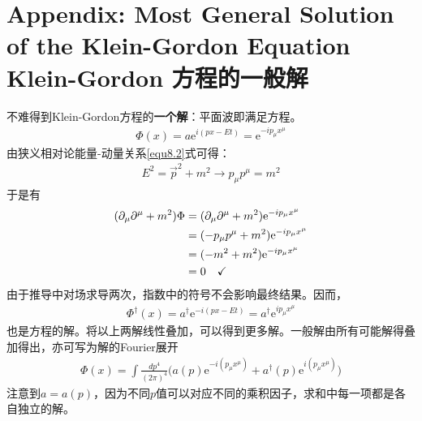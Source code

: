 \section[Klein-Gordon 方程的一般解]{Appendix: Most General Solution of the Klein-Gordon Equation \quad Klein-Gordon 方程的一般解}\label{sec9.6}
不难得到Klein-Gordon方程的\textbf{一个解}：平面波即满足方程。
\begin{gather*}
\Phi(x)=a\text{e}^{i(px-Et)}=\text{e}^{-ip_\mu x^\mu}
\end{gather*}
由狭义相对论能量-动量关系\eqref{equ8.2}式可得：
\begin{gather*}
E^2=\vec{p}^2+m^2\to p_\mu p^\mu=m^2
\end{gather*}
于是有
\begin{align}
(\partial_\mu\partial^\mu+m^2)\Phi&=(\partial_\mu\partial^\mu+m^2)\text{e}^{-ip_\mu x^\mu} \notag \\
&=(-p_\mu p^\mu+m^2)\text{e}^{-ip_\mu x^\mu} \notag \\
&=(-m^2+m^2)\text{e}^{-ip_\mu x^\mu} \notag \\
&=0\quad\checkmark \label{equ9.77}
\end{align}
由于推导中对场求导两次，指数中的符号不会影响最终结果。因而，
\begin{gather*}
\Phi^\dag(x)=a^\dag \text{e}^{-i(px-Et)}=a^\dag \text{e}^{ip_\mu x^\mu}
\end{gather*}
也是方程的解。将以上两解线性叠加，可以得到更多解。一般解由所有可能解得叠加得出，亦可写为解的Fourier展开
\begin{gather*}
\Phi(x)=\int \frac{dp^4}{(2\pi)^4}\Big( a(p)\text{e}^{-i(p_\mu x^\mu)}+a^\dag(p)\text{e}^{i(p_\mu x^\mu)} \Big)
\end{gather*}
注意到$a=a(p)$，因为不同$p$值可以对应不同的乘积因子，求和中每一项都是各自独立的解。

